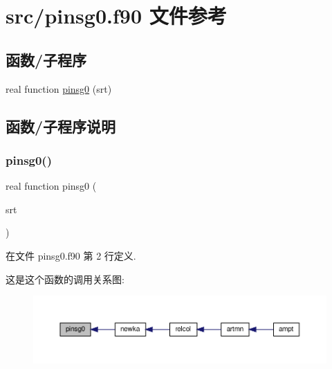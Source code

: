 \hypertarget{pinsg0_8f90}{}\section{src/pinsg0.f90 文件参考}
\label{pinsg0_8f90}
\subsection*{函数/子程序}
\begin{DoxyCompactItemize}
\item 
real function \mbox{\hyperlink{pinsg0_8f90_ae708e4b42dc9490f4cc669004e53e581}{pinsg0}} (srt)
\end{DoxyCompactItemize}


\subsection{函数/子程序说明}
\mbox{\label{pinsg0_8f90_ae708e4b42dc9490f4cc669004e53e581}} 
\subsubsection{\texorpdfstring{pinsg0()}{pinsg0()}}
{\footnotesize\ttfamily real function pinsg0 (\begin{DoxyParamCaption}\item[{}]{srt }\end{DoxyParamCaption})}



在文件 pinsg0.\+f90 第 2 行定义.

这是这个函数的调用关系图\+:
\nopagebreak
\begin{figure}[H]
\begin{center}
\leavevmode
\includegraphics[width=350pt]{pinsg0_8f90_ae708e4b42dc9490f4cc669004e53e581_icgraph}
\end{center}
\end{figure}
